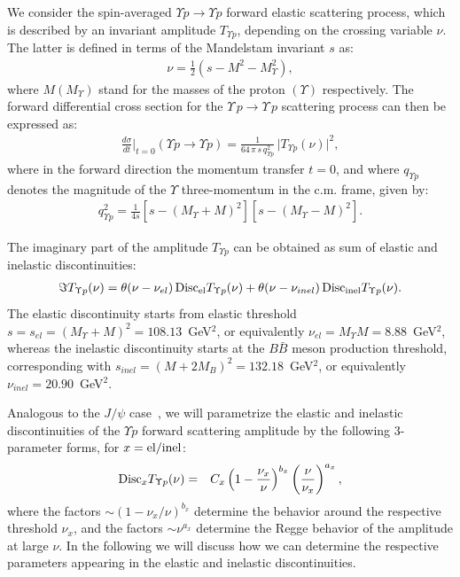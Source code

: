 \documentclass[10pt,prd,aps,nofootinbib,superscriptaddress]{revtex4}
\newcommand{\bea}{\begin{eqnarray}}
\newcommand{\eea}{\end{eqnarray}}
\begin{document}
We consider the spin-averaged $\Upsilon p \to \Upsilon p$ forward elastic scattering process, which is described by an invariant amplitude $T_{\Upsilon p}$, depending on the crossing variable $\nu$. The latter is defined in terms of the Mandelstam invariant $s$ as:
\bea
\nu = \frac{1}{2} (s - M^2 - M_\Upsilon^2),
\eea
where $M (M_\Upsilon)$ stand for the masses of the proton $(\Upsilon)$ respectively.  
The forward differential cross section for the $\Upsilon \, p \to \Upsilon \, p$ scattering process can then be expressed as:
\bea
\frac{d \sigma}{dt} \biggr|_{t = 0} (\Upsilon p \to \Upsilon p) = \frac{1}{64 \, \pi \, s \, q_{\Upsilon p}^2} \, \big| T_{\Upsilon p}(\nu) \big|^2,
\eea
where in the forward direction the momentum transfer $t = 0$, and where $q_{\Upsilon p}$ denotes the magnitude of the $\Upsilon$ three-momentum in the c.m. frame, given by:
 \bea 
 q_{\Upsilon p}^2  = \frac{1}{4 s} \left[ s - (M_\Upsilon + M)^2 \right] \left[ s - (M_\Upsilon - M)^2 \right].
 \eea 
 
The imaginary part of the amplitude $T_{\Upsilon p}$ can be obtained as sum of elastic and inelastic discontinuities:
\bea
\Im T_{\Upsilon p}(\nu)  = \theta(\nu - \nu_{el}) \,  {\rm Disc}_{\rm el} T_{\Upsilon p}(\nu) +   \theta(\nu - \nu_{inel}) \,  {\rm Disc}_{\rm inel} T_{\Upsilon p}(\nu).
\label{eq:disctot}
\eea
The elastic discontinuity starts from elastic threshold $s = s_{el} = (M_\Upsilon + M)^2 = 108.13$~GeV$^2$, or equivalently $\nu_{el} = M_\Upsilon M = 8.88$~GeV$^2$, whereas the inelastic discontinuity starts at the $B \bar B$ meson production threshold, corresponding with $s_{inel} = (M + 2 M_B)^2 = 132.18$~GeV$^2$, or equivalently $\nu_{inel} = 20.90$~GeV$^2$. 

Analogous to the $J/\psi$ case~\cite{Gryniuk:2016mpk}, we will parametrize the elastic and inelastic discontinuities of the $\Upsilon p$  forward scattering amplitude by the following 3-parameter forms, for $x = {\rm el/inel}$:
\bea
{\rm Disc}_{x} T_{\Upsilon p}(\nu)  &=& 
C_{x} \left( 1 - \frac{\nu_{x}}{\nu} \right)^{b_{x}}  \left( \frac{\nu}{\nu_{x}} \right)^{a_{x}} ,
\label{eq:discx} 
\eea
where the factors $\sim (1 - \nu_x / \nu)^{b_x}$  
determine the behavior around the respective threshold $\nu_x$, and the 
factors  $\sim \nu^{a_x}$ determine the Regge behavior of the amplitude at large $\nu$. 
In the following we will discuss how we can determine the respective parameters 
appearing in the elastic and inelastic discontinuities. 
\end{document}
